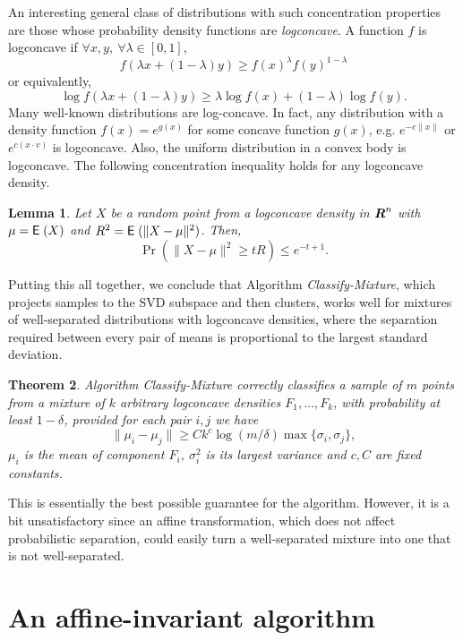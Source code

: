 \documentclass{book}
\newtheorem{theorem}{Theorem}[chapter]
\newtheorem{lemma}[theorem]{Lemma}
\numberwithin{exercise}{chapter}
\begin{document}
An interesting general class of distributions with such concentration properties are those whose probability density functions are {\em logconcave}. A function $f$ is logconcave if $\forall x,y,~\forall \lambda\in [0,1]$,
\[f(\lambda x + (1-\lambda) y)\ge f(x)^{\lambda} f(y)^{1-\lambda}\]
or equivalently,
\[\log f(\lambda x + (1-\lambda) y)\ge \lambda \log f(x) + (1-\lambda)\log f(y).\]
Many well-known distributions are log-concave.
In fact, any distribution with a density function $f(x)=e^{g(x)}$ for some concave function $g(x)$, e.g. $e^{-c\|x\|}$ or $e^{c(x\cdot v)}$ is logconcave. Also, the uniform distribution in a convex body is logconcave. The following concentration inequality \cite{Lovasz2007} holds for any logconcave density.

\begin{lemma}\label{logcon-conc}
Let $X$ be a random point from a logconcave density in $\mbox{\mbox{\boldmath $R$}}^n$ with $\mu = \hbox{{\sf E}\;}(X)$ and $R^2 = \hbox{{\sf E}\;}(\|X-\mu\|^2)$. Then,
\[
\Pr(\|X-\mu\|^2 \ge tR) \le e^{-t+1}.
\]
\end{lemma}

Putting this all together, we conclude that Algorithm {\em Classify-Mixture}, which projects samples to the SVD subspace and then clusters, works well for mixtures of well-separated distributions with logconcave densities, where the separation required between every pair of means is proportional to the largest standard deviation.

\begin{theorem}
Algorithm {\em Classify-Mixture} correctly classifies a sample of $m$ points from a mixture of $k$ arbitrary logconcave densities $F_1, \ldots, F_k$, with probability at least $1-\delta$, provided for each pair $i,j$ we have
\[
\|\mu_i-\mu_j\| \ge C k^c\log(m/\delta) \max\{\sigma_i, \sigma_j\},
\]
$\mu_i$ is the mean of component $F_i$, $\sigma_i^2$ is its largest variance and $c,C$ are fixed constants.
\end{theorem}

This is essentially the best possible guarantee for the algorithm. However, it is a bit unsatisfactory since an affine transformation, which does not affect probabilistic separation, could easily turn a well-separated mixture into one that is not well-separated.

\section{An affine-invariant algorithm}
\end{document}
